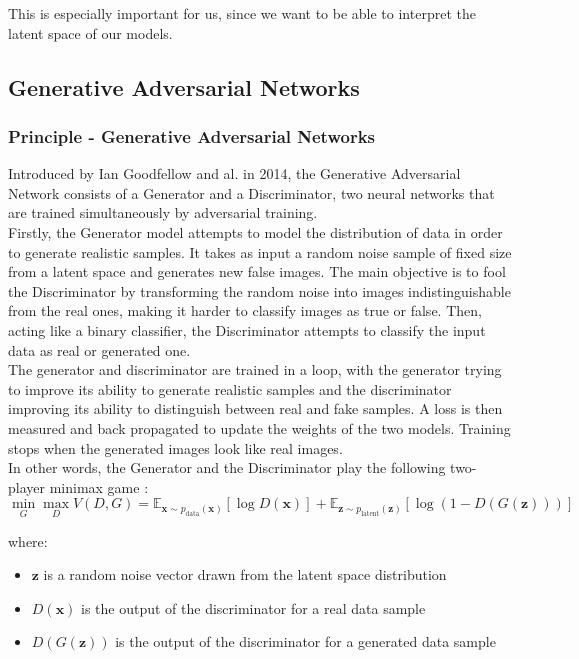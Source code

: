 \documentclass{article}
\begin{document}
This is especially important for us, since we want to be able to interpret the latent space of our models.


\subsection{Generative Adversarial Networks}
\subsubsection*{Principle - Generative Adversarial Networks}
\quad Introduced by Ian Goodfellow and al. in 2014, the Generative Adversarial Network consists of a Generator and a Discriminator, two neural networks that are trained simultaneously by adversarial training. \\
Firstly, the Generator model attempts to model the distribution of data in order to generate realistic samples. 
It takes as input a random noise sample of fixed size from a latent space and generates new false images. 
The main objective is to fool the Discriminator by transforming the random noise into images indistinguishable from the real ones, making it harder to classify images as true or false. 
Then, acting like a binary classifier, the Discriminator attempts to classify the input data as real or generated one. \\

The generator and discriminator are trained in a loop, with the generator trying to improve its ability to generate realistic samples and the discriminator improving its ability to distinguish between real and fake samples. 
A loss is then measured and back propagated to update the weights of the two models. 
Training stops when the generated images look like real images.\\
In other words, the Generator and the Discriminator play the following two-player minimax game :
$$ \min_G \max_D V(D, G) = \mathbb{E}_{\mathbf{x} \sim p_{\text{data}}(\mathbf{x})} [\log D(\mathbf{x})] + \mathbb{E}_{\mathbf{z} \sim p_{\text{latent}}(\mathbf{z})} [\log (1 - D(G(\mathbf{z})))] $$

where:

\begin{itemize}
    \item $\mathbf{z}$ is a random noise vector drawn from the latent space distribution 
    \item $D(\mathbf{x})$ is the output of the discriminator for a real data sample
    \item $D(G(\mathbf{z}))$ is the output of the discriminator for a generated data sample
\end{itemize}
\end{document}
